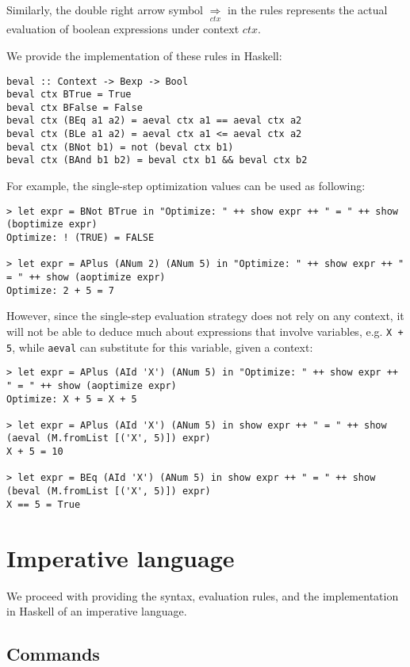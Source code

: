 \documentclass{article}
\theoremstyle{definition}
\begin{document}
Similarly, the double right arrow symbol $\underset{ctx}{\Rightarrow}$ in the rules represents the actual evaluation of boolean expressions under context $ctx$.

We provide the implementation of these rules in Haskell:

\begin{lstlisting}
beval :: Context -> Bexp -> Bool
beval ctx BTrue = True
beval ctx BFalse = False
beval ctx (BEq a1 a2) = aeval ctx a1 == aeval ctx a2
beval ctx (BLe a1 a2) = aeval ctx a1 <= aeval ctx a2
beval ctx (BNot b1) = not (beval ctx b1)
beval ctx (BAnd b1 b2) = beval ctx b1 && beval ctx b2
\end{lstlisting}

For example, the single-step optimization values can be used as following:

\begin{lstlisting}
> let expr = BNot BTrue in "Optimize: " ++ show expr ++ " = " ++ show (boptimize expr)
Optimize: ! (TRUE) = FALSE

> let expr = APlus (ANum 2) (ANum 5) in "Optimize: " ++ show expr ++ " = " ++ show (aoptimize expr)
Optimize: 2 + 5 = 7
\end{lstlisting}

However, since the single-step evaluation strategy does not rely on any context, it will not be able to deduce much about expressions that involve variables, e.g. \texttt{X + 5}, while \texttt{aeval} can substitute for this variable, given a context:

\begin{lstlisting}
> let expr = APlus (AId 'X') (ANum 5) in "Optimize: " ++ show expr ++ " = " ++ show (aoptimize expr)
Optimize: X + 5 = X + 5

> let expr = APlus (AId 'X') (ANum 5) in show expr ++ " = " ++ show (aeval (M.fromList [('X', 5)]) expr)
X + 5 = 10

> let expr = BEq (AId 'X') (ANum 5) in show expr ++ " = " ++ show (beval (M.fromList [('X', 5)]) expr)
X == 5 = True
\end{lstlisting}

\section{Imperative language}

We proceed with providing the syntax, evaluation rules, and the implementation in Haskell of an imperative language.

\subsection{Commands}
\end{document}
